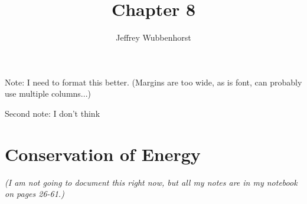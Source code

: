 \documentclass[12pt,letterpaper]{article}
\author{Jeffrey Wubbenhorst}
\title{Chapter 8}
\begin{document}
\maketitle


Note: I need to format this better. (Margins are too wide, as is font, can probably use multiple columns...) 


Second note: I don't think 

\section{Conservation of Energy}

{\large \textit{(I am not going to document this right now, but all my notes are in my notebook on pages 26-61.)}} 
\end{document}
